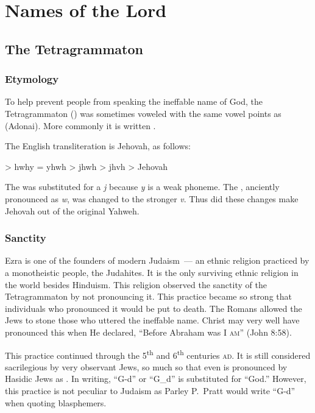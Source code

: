 \section{Names of the Lord}\label{app:names-of-the-lord}
\subsection{The Tetragrammaton}
\subsubsection{Etymology}
To help prevent people from speaking the ineffable name of God, the Tetragrammaton () was sometimes voweled with the same vowel points as  (Adonai). More commonly it is written .

The English transliteration is Jehovah, as follows:
\begin{center}
     > hwhy = yhwh > jhwh > jhvh > Jehovah
\end{center}
The  was substituted for a \textit{j} because \textit{y} is a weak phoneme. The , anciently pronounced as \textit{w}, was changed to the stronger \textit{v}. Thus did these changes make Jehovah out of the original Yahweh.


\subsubsection{Sanctity}
Ezra is one of the founders of modern Judaism~--- an ethnic religion practiced by a monotheistic people, the Judahites. It is the only surviving ethnic religion in the world besides Hinduism. This religion observed the sanctity of the Tetragrammaton by not pronouncing it. This practice became so strong that individuals who pronounced it would be put to death. The Romans allowed the Jews to stone those who uttered the ineffable name. Christ may very well have pronounced this when He declared, ``Before Abraham was \textsc{I am}'' (John 8:58).

This practice continued through the 5\textsuperscript{th} and 6\textsuperscript{th} centuries \textsc{ad}. It is still considered sacrilegious by very observant Jews, so much so that even  is pronounced by Hasidic Jews as . In writing, ``G-d'' or ``G\_{}d'' is substituted for ``God.'' However, this practice is not peculiar to Judaism as Parley P.\ Pratt would write ``G-d'' when quoting blasphemers.

